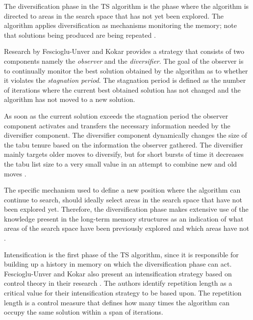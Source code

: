 The diversification phase in the \gls{TS} algorithm is the phase where the algorithm is directed to areas in the search space that has not yet been explored. The algorithm applies diversification as mechanisms monitoring the memory; note that solutions being produced are being repeated \cite{ReactiveTabuVHR,SelfControllingReactiveTabu}. 

Research by Fescioglu-Unver and Kokar \cite{SelfControllingReactiveTabu} provides a strategy that consists of two components namely the \emph{observer} and the \emph{diversifier}. The goal of the observer is to continually monitor the best solution obtained by the algorithm as to whether it violates the \emph{stagnation period}. The stagnation period is defined as the number of iterations where the current best obtained solution has not changed and the algorithm has not moved to a new solution\cite{SelfControllingReactiveTabu}. 

As soon as the current solution exceeds the stagnation period the observer component activates and transfers the necessary information needed by the diversifier component. The diversifier component dynamically changes the size of the tabu tenure based on the information the observer gathered. The diversifier mainly targets older moves to diversify, but for short bursts of time it decreases the tabu list size to a very small value in an attempt to combine new and old moves \cite{SelfControllingReactiveTabu}.

The specific mechanism used to define a new position where the algorithm can continue to search, should ideally select areas in the search space that have not been explored yet\cite{NonlinearGlobalTabu,SelfControllingReactiveTabu}. Therefore, the diversification phase makes extensive use of the knowledge present in the long-term memory structures as an indication of what areas of the search space have been previously explored and which areas have not \cite{NonlinearGlobalTabu,SelfControllingReactiveTabu}.

Intensification is the first phase of the \gls{TS} algorithm, since it is responsible for building up a history in memory on which the diversification phase can act. Fescioglu-Unver and Kokar also present an intensification strategy based on control theory in their research \cite{SelfControllingReactiveTabu}. The authors identify repetition length as a critical value for their intensification strategy to be based upon. The repetition length is a control measure that defines how many times the algorithm can occupy the same solution within a span of iterations.

